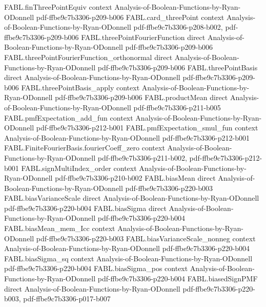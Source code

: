 \begin{theorem}
\proofstep
  {FABL.finThreePointEquiv}
  {context}
  {Analysis-of-Boolean-Functions-by-Ryan-ODonnell}
  {pdf-ffbe9c7b3306-p209-b006}
\proofstep
  {FABL.card_threePoint}
  {context}
  {Analysis-of-Boolean-Functions-by-Ryan-ODonnell}
  {pdf-ffbe9c7b3306-p208-b002,
    pdf-ffbe9c7b3306-p209-b006}
\proofstep
  {FABL.threePointFourierFunction}
  {direct}
  {Analysis-of-Boolean-Functions-by-Ryan-ODonnell}
  {pdf-ffbe9c7b3306-p209-b006}
\proofstep
  {FABL.threePointFourierFunction_orthonormal}
  {direct}
  {Analysis-of-Boolean-Functions-by-Ryan-ODonnell}
  {pdf-ffbe9c7b3306-p209-b006}
\proofstep
  {FABL.threePointBasis}
  {direct}
  {Analysis-of-Boolean-Functions-by-Ryan-ODonnell}
  {pdf-ffbe9c7b3306-p209-b006}
\proofstep
  {FABL.threePointBasis_apply}
  {context}
  {Analysis-of-Boolean-Functions-by-Ryan-ODonnell}
  {pdf-ffbe9c7b3306-p209-b006}
\proofstep
  {FABL.productMean}
  {direct}
  {Analysis-of-Boolean-Functions-by-Ryan-ODonnell}
  {pdf-ffbe9c7b3306-p211-b005}
\proofstep
  {FABL.pmfExpectation_add_fun}
  {context}
  {Analysis-of-Boolean-Functions-by-Ryan-ODonnell}
  {pdf-ffbe9c7b3306-p212-b001}
\proofstep
  {FABL.pmfExpectation_smul_fun}
  {context}
  {Analysis-of-Boolean-Functions-by-Ryan-ODonnell}
  {pdf-ffbe9c7b3306-p212-b001}
\proofstep
  {FABL.FiniteFourierBasis.fourierCoeff_zero}
  {context}
  {Analysis-of-Boolean-Functions-by-Ryan-ODonnell}
  {pdf-ffbe9c7b3306-p211-b002,
    pdf-ffbe9c7b3306-p212-b001}
\proofstep
  {FABL.signMultiIndex_order}
  {context}
  {Analysis-of-Boolean-Functions-by-Ryan-ODonnell}
  {pdf-ffbe9c7b3306-p210-b002}
\proofstep
  {FABL.biasMean}
  {direct}
  {Analysis-of-Boolean-Functions-by-Ryan-ODonnell}
  {pdf-ffbe9c7b3306-p220-b003}
\proofstep
  {FABL.biasVarianceScale}
  {direct}
  {Analysis-of-Boolean-Functions-by-Ryan-ODonnell}
  {pdf-ffbe9c7b3306-p220-b004}
\proofstep
  {FABL.biasSigma}
  {direct}
  {Analysis-of-Boolean-Functions-by-Ryan-ODonnell}
  {pdf-ffbe9c7b3306-p220-b004}
\proofstep
  {FABL.biasMean_mem_Icc}
  {context}
  {Analysis-of-Boolean-Functions-by-Ryan-ODonnell}
  {pdf-ffbe9c7b3306-p220-b003}
\proofstep
  {FABL.biasVarianceScale_nonneg}
  {context}
  {Analysis-of-Boolean-Functions-by-Ryan-ODonnell}
  {pdf-ffbe9c7b3306-p220-b004}
\proofstep
  {FABL.biasSigma_sq}
  {context}
  {Analysis-of-Boolean-Functions-by-Ryan-ODonnell}
  {pdf-ffbe9c7b3306-p220-b004}
\proofstep
  {FABL.biasSigma_pos}
  {context}
  {Analysis-of-Boolean-Functions-by-Ryan-ODonnell}
  {pdf-ffbe9c7b3306-p220-b004}
\proofstep
  {FABL.biasedSignPMF}
  {direct}
  {Analysis-of-Boolean-Functions-by-Ryan-ODonnell}
  {pdf-ffbe9c7b3306-p220-b003,
    pdf-ffbe9c7b3306-p017-b007}

\end{theorem}
